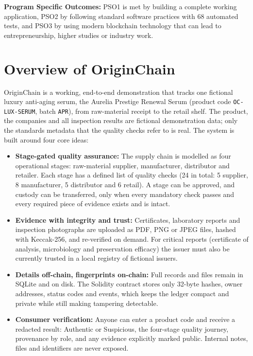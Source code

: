 \documentclass[12pt,a4paper]{report}
\begin{document}
\vspace{0.3cm}
\noindent \textbf{Program Specific Outcomes:} PSO1 is met by building a complete working application, PSO2 by following standard software practices with 68 automated tests, and PSO3 by using modern blockchain technology that can lead to entrepreneurship, higher studies or industry work.

\section{Overview of OriginChain}
OriginChain is a working, end-to-end demonstration that tracks one fictional luxury anti-aging serum, the Aurelia Prestige Renewal Serum (product code \texttt{OC\allowbreak-LUX\allowbreak-SERUM}, batch \texttt{APR}), from raw-material receipt to the retail shelf. The product, the companies and all inspection results are fictional demonstration data; only the standards metadata that the quality checks refer to is real. The system is built around four core ideas:
\begin{itemize}[leftmargin=1.8em, itemsep=3pt, parsep=0pt]
    \item \textbf{Stage-gated quality assurance:} The supply chain is modelled as four operational stages: raw-material supplier, manufacturer, distributor and retailer. Each stage has a defined list of quality checks (24 in total: 5 supplier, 8 manufacturer, 5 distributor and 6 retail). A stage can be approved, and custody can be transferred, only when every mandatory check passes and every required piece of evidence exists and is intact.
    \item \textbf{Evidence with integrity and trust:} Certificates, laboratory reports and inspection photographs are uploaded as PDF, PNG or JPEG files, hashed with Keccak-256, and re-verified on demand. For critical reports (certificate of analysis, microbiology and preservation efficacy) the issuer must also be currently trusted in a local registry of fictional issuers.
    \item \textbf{Details off-chain, fingerprints on-chain:} Full records and files remain in SQLite and on disk. The Solidity contract stores only 32-byte hashes, owner addresses, status codes and events, which keeps the ledger compact and private while still making tampering detectable.
    \item \textbf{Consumer verification:} Anyone can enter a product code and receive a redacted result: Authentic or Suspicious, the four-stage quality journey, provenance by role, and any evidence explicitly marked public. Internal notes, files and identifiers are never exposed.
\end{itemize}
\end{document}
